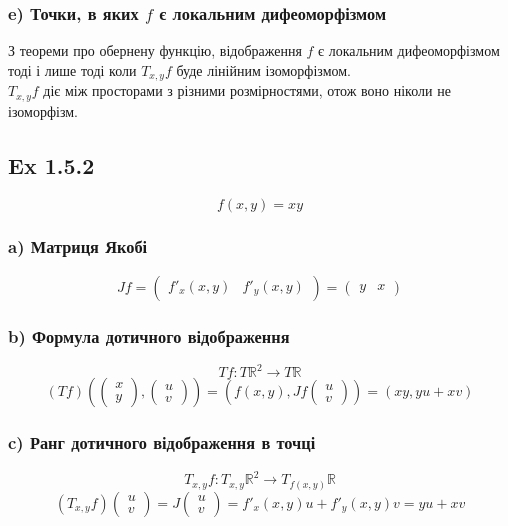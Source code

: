 \documentclass[10pt, a4paper]{article} %
\newcommand{\R}{\mathbb{R}}
\newcommand{\J}{J}
\newcommand{\todo}[1]{\colorbox{red}{\textbf{TODO}: #1}}
\begin{document}
\subsubsection*{e) Точки, в яких $f$ є локальним дифеоморфізмом}
З теореми про обернену функцію, відображення $f$ є локальним дифеоморфізмом тоді і лише тоді коли
$T_{x,y}f$ буде лінійним ізоморфізмом. \\
$T_{x,y}f$ діє між просторами з різними розмірностями, отож воно ніколи не ізоморфізм. 





\subsection*{Ex 1.5.2}
\begin{mdframed}
    \[f(x,y) = xy\]
\end{mdframed}

\subsubsection*{a) Матриця Якобі}
\[\J f = \begin{pmatrix}
    f'_x(x,y) & f'_y(x,y)
\end{pmatrix} = \begin{pmatrix}
    y & x
\end{pmatrix}\]

\subsubsection*{b) Формула дотичного відображення}
\[Tf : T\R^2 \to T\R\]
\[(Tf)\left(\begin{pmatrix} x \\ y \end{pmatrix}, \begin{pmatrix} u \\ v \end{pmatrix}\right) 
= \left(f(x,y),\J f \begin{pmatrix} u \\ v \end{pmatrix}\right) 
= \left(xy, yu+xv\right)\]

\subsubsection*{c) Ранг дотичного відображення в точці}
\[T_{x,y} f : T_{x,y}\R^2 \to T_{f(x,y)}\R\]
\[(T_{x,y} f) \begin{pmatrix} u \\ v \end{pmatrix}
= J\begin{pmatrix} u \\ v \end{pmatrix} = f'_x(x,y) u + f'_y(x,y) v = yu+xv\]
\end{document}
